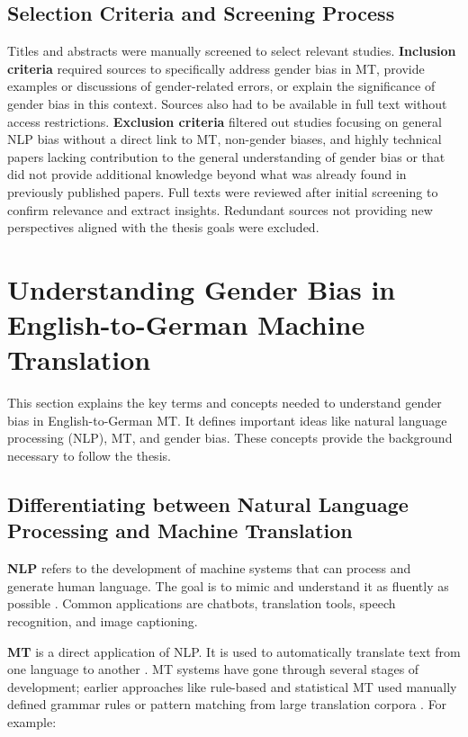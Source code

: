 \subsection{Selection Criteria and Screening Process}\label{subsection:selection_criteria}
Titles and abstracts were manually screened to select relevant studies. \textbf{Inclusion criteria} required sources to specifically address gender bias in MT, provide examples or discussions of gender-related errors, or explain the significance of gender bias in this context. Sources also had to be available in full text without access restrictions. \textbf{Exclusion criteria} filtered out studies focusing on general NLP bias without a direct link to MT, non-gender biases, and highly technical papers lacking contribution to the general understanding of gender bias or that did not provide additional knowledge beyond what was already found in previously published papers. Full texts were reviewed after initial screening to confirm relevance and extract insights. Redundant sources not providing new perspectives aligned with the thesis goals were excluded.


\section{Understanding Gender Bias in English-to-German Machine Translation}

This section explains the key terms and concepts needed to understand gender bias in English-to-German MT. It defines important ideas like natural language processing (NLP), MT, and gender bias. These concepts provide the background necessary to follow the thesis.

\subsection{Differentiating between Natural Language Processing and Machine Translation}
\textbf{NLP} refers to the development of machine systems that can process and generate human language. The goal is to mimic and understand it as fluently as possible \citep{smacchiaDoesAIReflect2024,ullmannGenderBiasMachine2022}. Common applications are chatbots, translation tools, speech recognition, and image captioning.

\textbf{MT} is a direct application of NLP. It is used to automatically translate text from one language to another \citep{linMachineTranslationAcademic2009}. MT systems have gone through several stages of development; earlier approaches like rule-based and statistical MT used manually defined grammar rules or pattern matching from large translation corpora \citep{chakravarthiSurveyOrthographicInformation2021}. For example:

